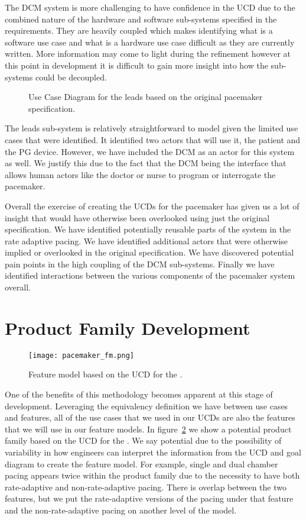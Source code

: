 The DCM system is more challenging to have confidence in the UCD due to the combined nature of the hardware and software sub-systems specified in the requirements. They are heavily coupled which makes identifying what is a software use case and what is a hardware use case difficult as they are currently written. More information may come to light during the refinement however at this point in development it is difficult to gain more insight into how the sub-systems could be decoupled.

\begin{figure}
	\centering
	
	\caption{Use Case Diagram for the leads based on the original pacemaker specification.}
	\label{fig:Leads_UCD_original_spec}
\end{figure}

The leads sub-system is relatively straightforward to model given the limited use cases that were identified. It identified two actors that will use it, the patient and the PG device. However, we have included the DCM as an actor for this system as well. We justify this due to the fact that the DCM being the interface that allows human actors like the doctor or nurse to program or interrogate the pacemaker. 

Overall the exercise of creating the UCDs for the pacemaker has given us a lot of insight that would have otherwise been overlooked using just the original specification. We have identified potentially reusable parts of the system in the rate adaptive pacing. We have identified additional actors that were otherwise implied or overlooked in the original specification. We have discovered potential pain points in the high coupling of the DCM sub-systems. Finally we have identified interactions between the various components of the pacemaker system overall.

\section{Product Family Development}

\begin{figure}
	\centering
	\texttt{[image: pacemaker\_fm.png]}
	\caption{Feature model based on the UCD for the \pgd.}
	\label{fig:pacemaker_fm}
\end{figure}

One of the benefits of this methodology becomes apparent at this stage of development. Leveraging the equivalency definition we have between use cases and features, all of the use cases that we used in our UCDs are also the features that we will use in our feature models. In figure~\ref{fig:pacemaker_fm} we show a potential product family based on the UCD for the \pgd. We say potential due to the possibility of variability in how engineers can interpret the information from the UCD and goal diagram to create the feature model. For example, single and dual chamber pacing appears twice within the product family due to the necessity to have both rate-adaptive and non-rate-adaptive pacing. There is overlap between the two features, but we put the rate-adaptive versions of the pacing under that feature and the non-rate-adaptive pacing on another level of the model.

